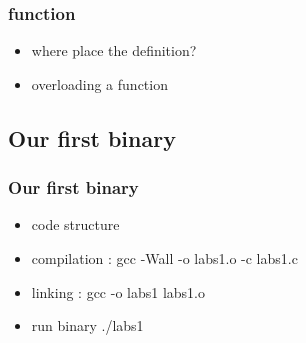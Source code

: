 \documentclass{beamer}
\begin{document}
\begin{frame}
  \frametitle{function}
	\begin{itemize}
		\item where place the definition?
		\item overloading a function
	\end{itemize}
\end{frame}

\subsection{Our first binary}
\label{sub:first_programm}

\begin{frame}
  \frametitle{Our first binary}
	\begin{itemize}
		\item code structure
		\item compilation : gcc  -Wall  -o labs1.o   -c labs1.c
		\item linking : gcc -o labs1  labs1.o
		\item run binary ./labs1
	\end{itemize}
\end{frame}
\end{document}
